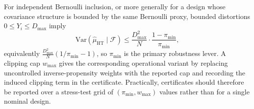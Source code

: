 For independent Bernoulli inclusion, or more generally for a design whose covariance structure is bounded by the same Bernoulli proxy, bounded distortions $0\le Y_i\le D_{\max}$ imply
\[
\mathrm{Var}\!\left(\hat{\mu}_{\mathrm{HT}}\mid\mathcal{F}\right)
\le
\frac{D_{\max}^2}{N}\cdot \frac{1-\pi_{\min}}{\pi_{\min}},
\]
equivalently $\frac{D_{\max}^2}{N}(1/\pi_{\min}-1)$, so $\pi_{\min}$ is the primary robustness lever. A clipping cap $w_{\max}$ gives the corresponding operational variant by replacing uncontrolled inverse-propensity weights with the reported cap and recording the induced clipping term in the certificate. Practically, certificates should therefore be reported over a stress-test grid of $(\pi_{\min}, w_{\max})$ values rather than for a single nominal design.
